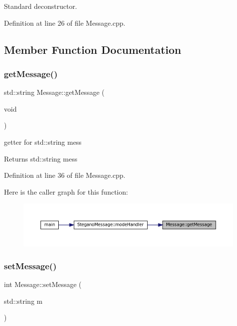 Standard deconstructor. 

Definition at line 26 of file Message.\+cpp.



\subsection{Member Function Documentation}
\mbox{\label{classMessage_a8d2e67a8732ecaeca309df6ac5dda156}} 
\subsubsection{\texorpdfstring{getMessage()}{getMessage()}}
{\footnotesize\ttfamily std\+::string Message\+::get\+Message (\begin{DoxyParamCaption}\item[{void}]{ }\end{DoxyParamCaption})}



getter for std\+::string mess 

\begin{DoxyReturn}{Returns}
std\+::string mess 
\end{DoxyReturn}


Definition at line 36 of file Message.\+cpp.

Here is the caller graph for this function\+:\nopagebreak
\begin{figure}[H]
\begin{center}
\leavevmode
\includegraphics[width=350pt]{classMessage_a8d2e67a8732ecaeca309df6ac5dda156_icgraph}
\end{center}
\end{figure}
\mbox{\label{classMessage_aa1e4c60f94308a9367ad3106c34b28f3}} 
\subsubsection{\texorpdfstring{setMessage()}{setMessage()}}
{\footnotesize\ttfamily int Message\+::set\+Message (\begin{DoxyParamCaption}\item[{std\+::string}]{m }\end{DoxyParamCaption})}



